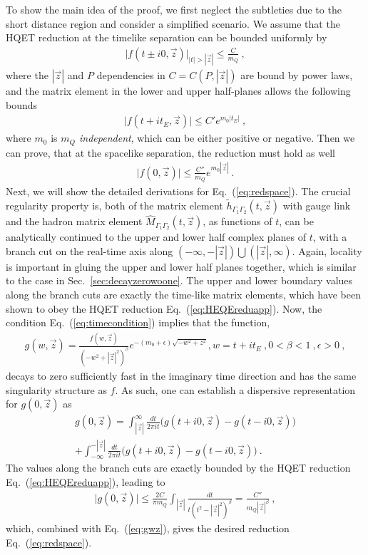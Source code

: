 \documentclass[a4paper,11pt]{article}
\begin{document}
To show the main idea of the proof, we first neglect the subtleties due to the short distance region and consider a simplified scenario. We assume that the HQET reduction at the timelike separation can be bounded uniformly by 
\begin{align}
\bigg|f(t\pm i0,\vec{z})\bigg|_{|t|>|\vec{z}|}\le \frac{C}{m_Q }  \ , \label{eq:HEQEreduapp}
\end{align}
where the $|\vec{z}|$ and $P$ dependencies in $C=C(P,|\vec{z}|)$ are bound by power laws, and the matrix element in the lower and upper half-planes allows the following bounds
\begin{align}
\bigg|f(t+it_E,\vec{z})\bigg|\le C'e^{m_0|t_E|}\ , \label{eq:timecondition}
\end{align}
where $m_0$ is {\it $m_Q$ independent}, which can be either positive or negative. Then we can prove, that at the spacelike separation, the reduction must hold as well
\begin{align}
\bigg|f(0,\vec{z})\bigg|\le \frac{C''}{m_Q} e^{m_0|\vec{z}|}\ . \label{eq:redspace}
\end{align}
Next, we will show the detailed derivations for Eq.~(\ref{eq:redspace}). The crucial regularity property is, both of the matrix element $\tilde h_{\Gamma_1\Gamma_2}(t,\vec{z})$ with gauge link and the hadron matrix element $\hat M_{\Gamma_1\Gamma_2}(t,\vec{z})$, as functions of $t$, can be analytically continued to the upper and lower half complex planes of $t$, with a branch cut on the real-time axis along $(-\infty,-|\vec{z}|) \bigcup (|\vec{z}|,\infty)$. Again, locality is important in gluing the upper and lower half planes together, which is similar to the case in Sec.~\ref{sec:decayzerowoone}. The upper and lower boundary values along the branch cuts are exactly the time-like matrix elements, which have been shown to obey the HQET reduction Eq.~(\ref{eq:HEQEreduapp}). Now, the condition Eq.~(\ref{eq:timecondition}) implies that the function, 
\begin{align}\label{eq:gwz}
g(w,\vec{z})=\frac{f(w,\vec{z})}{(-w^2+|\vec{z}|^2)^{\beta}}e^{-(m_0+\epsilon)\sqrt{-w^2+z^2}}, w=t+it_E \ , 0<\beta<1 \ , \epsilon>0 \ ,
\end{align}
decays to zero sufficiently fast in the imaginary time direction and has the same singularity structure as $f$. As such, one can establish a dispersive representation for $g(0,\vec{z})$ as
\begin{align} \label{eq:siperg}
g(0,\vec{z})=\int_{|\vec{z}|}^{\infty}\frac{dt}{2\pi i t}\bigg(g(t+i0,\vec{z})-g(t-i0,\vec{z})\bigg)\nonumber \\ +\int^{-|\vec{z}|}_{-\infty}\frac{dt}{2\pi i t}\bigg(g(t+i0,\vec{z})-g(t-i0,\vec{z})\bigg) \ .
\end{align}
The values along the branch cuts are exactly bounded by the HQET reduction Eq.~(\ref{eq:HEQEreduapp}), leading to 
\begin{align}
\bigg|g(0,\vec{z})\bigg|\le \frac{2C}{\pi m_Q}\int_{|\vec{z}|}\frac{dt}{t(t^2-|\vec{z}|^2)^{\beta}}=\frac{C''}{ m_Q |\vec{z}|^{\beta}} \ , 
\end{align}
which, combined with Eq.~(\ref{eq:gwz}), gives the desired reduction Eq.~(\ref{eq:redspace}). 
\end{document}
